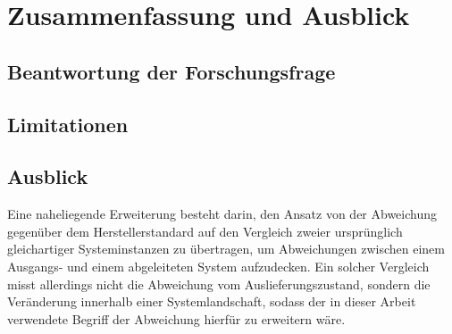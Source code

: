 \chapter{Zusammenfassung und Ausblick}
\label{ZusammenfassungAusblick}

\section{Beantwortung der Forschungsfrage}
\label{sec:ff-antwort}

\section{Limitationen}
\label{sec:limitationen}

\section{Ausblick}
\label{sec:ausblick}

Eine naheliegende Erweiterung besteht darin, den Ansatz von der Abweichung gegenüber dem Herstellerstandard auf den Vergleich zweier ursprünglich gleichartiger Systeminstanzen zu übertragen, um Abweichungen zwischen einem Ausgangs- und einem abgeleiteten System aufzudecken. %
Ein solcher Vergleich misst allerdings nicht die Abweichung vom Auslieferungszustand, sondern die Veränderung innerhalb einer Systemlandschaft, sodass der in dieser Arbeit verwendete Begriff der Abweichung hierfür zu erweitern wäre.
